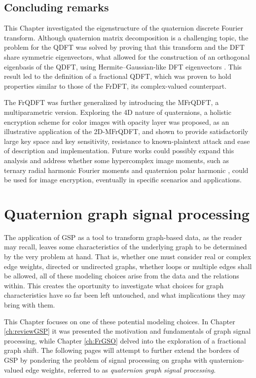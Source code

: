 \section{Concluding remarks}
\label{sec:conclusao}
This Chapter investigated the eigenstructure of the quaternion discrete Fourier transform. Although quaternion matrix decomposition is a challenging topic, the problem for the QDFT was solved by proving that this transform and the DFT share symmetric eigenvectors, what allowed for the construction of an orthogonal eigenbasis of the QDFT, using Hermite--Gaussian-like DFT eigenvectors \cite{de2017discrete}. This result led to the definition of a fractional QDFT, which was proven to hold properties similar to those of the FrDFT, its complex-valued counterpart.

The FrQDFT was further generalized by introducing the MFrQDFT, a multiparametric version. Exploring the 4D nature of quaternions, a holistic encryption scheme for color images with opacity layer was proposed, as an illustrative application of the 2D-MFrQDFT, and shown to provide satisfactorily large key space and key sensitivity, resistance to known-plaintext attack and ease of description and implementation. Future works could possibly expand this analysis and address whether some hypercomplex image moments, such as ternary radial harmonic Fourier moments and quaternion polar harmonic \cite{wang2019ternary,wang2018quaternion}, could be used for image encryption, eventually in specific scenarios and applications.


\chapter{Quaternion graph signal processing}
\label{ch:QGSP}

The application of GSP as a tool to transform graph-based data, as the reader may recall, leaves some characteristics of the underlying graph to be determined by the very problem at hand. That is, whether one must consider real or complex edge weights, directed or undirected graphs, whether loops or multiple edges shall be allowed, all of these modeling choices arise from the data and the relations within. This creates the oportunity to investigate what choices for graph characteristics have so far been left untouched, and what implications they may bring with them.

This Chapter focuses on one of these potential modeling choices. In Chapter \ref{ch:reviewGSP} it was presented the motivation and fundamentals of graph signal processing, while Chapter \ref{ch:FrGSO} delved into the exploration of a fractional graph shift. The following pages will attempt to further extend the borders of GSP by pondering the problem of signal processing on graphs with quaternion-valued edge weights, referred to as \textit{quaternion graph signal processing}.


